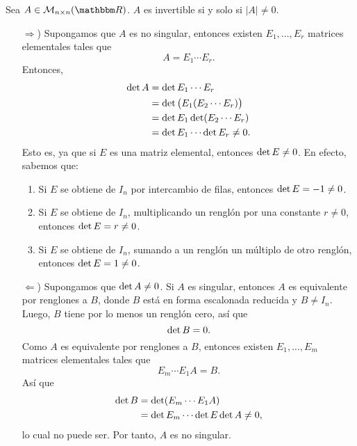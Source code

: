 \newpage

\begin{theorem}\label{singular_determinante}
    Sea $A \in \mathcal{M}_{n \times n}(\RR)$. $A$ es invertible si y solo si $|A| \neq 0$. \\
    \demostracion
    \begin{enumerate}
        \item[$\bm{\Rightarrow}$)] Supongamos que $A$ es no singular, entonces existen $E_1, \dots, E_r$ matrices elementales tales que
        $$A=E_1 \cdots E_r.$$
        Entonces,
        \begin{align*}
            \operatorname{det} A & = \operatorname{det} E_1 \cdots E_r \\
            & = \operatorname{det} \big(E_1 (E_2 \cdots E_r) \big) \\
            & = \operatorname{det} E_1  \operatorname{det} (E_2 \cdots E_r) \\
            & = \operatorname{det} E_1 \cdots \operatorname{det} E_r \neq 0.
        \end{align*}
        Esto es, ya que si $E$ es una matriz elemental, entonces $\operatorname{det} E \neq 0$. En efecto, sabemos que:
        \begin{enumerate}[label=\roman*)]
            \item Si $E$ se obtiene de $I_n$ por intercambio de filas, entonces $\operatorname{det} E =-1 \neq 0$.
            \item Si $E$ se obtiene de $I_n$, multiplicando un renglón por una constante $r \neq 0$, entonces $\operatorname{det} E=r \neq 0$.
            \item Si $E$ se obtiene de $I_n$, sumando a un renglón un múltiplo de otro renglón, entonces $\operatorname{det} E=1 \neq 0$.
        \end{enumerate}
        \item[$\bm{\Leftarrow}$)] Supongamos que $\operatorname{det} A \neq 0$. Si $A$ es singular, entonces $A$ es equivalente por renglones a $B$, donde $B$ está en forma escalonada reducida y $B \neq I_n$. Luego, $B$ tiene por lo menos un renglón cero, así que
        $$\operatorname{det} B=0.$$
        Como $A$ es equivalente por renglones a $B$, entonces existen $E_1, \dots, E_m$ matrices elementales tales que
        $$E_m \cdots E_1 A=B.$$
        Así que
        \begin{align*}
            \operatorname{det} B & = \operatorname{det} (E_m \cdots E_1 A) \\
            & = \operatorname{det} E_m \cdots \operatorname{det} E  \operatorname{det} A \neq 0,
        \end{align*}
        lo cual no puede ser. Por tanto, $A$ es no singular.
    \end{enumerate}
\end{theorem}

